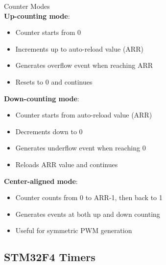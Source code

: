\begin{concept}{Counter Modes}\\
\textbf{Up-counting mode}:
\begin{itemize}
    \item Counter starts from 0
    \item Increments up to auto-reload value (ARR)
    \item Generates overflow event when reaching ARR
    \item Resets to 0 and continues
\end{itemize}
\textbf{Down-counting mode}:
\begin{itemize}
    \item Counter starts from auto-reload value (ARR)
    \item Decrements down to 0
    \item Generates underflow event when reaching 0
    \item Reloads ARR value and continues
\end{itemize}
\textbf{Center-aligned mode}:
\begin{itemize}
    \item Counter counts from 0 to ARR-1, then back to 1
    \item Generates events at both up and down counting
    \item Useful for symmetric PWM generation
\end{itemize}
\end{concept}

\subsection{STM32F4 Timers}

